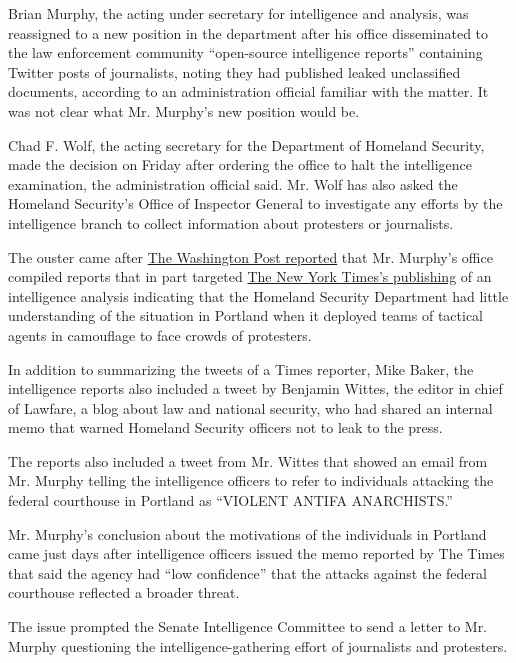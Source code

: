 Brian Murphy, the acting under secretary for intelligence and analysis,
was reassigned to a new position in the department after his office
disseminated to the law enforcement community ``open-source intelligence
reports'' containing Twitter posts of journalists, noting they had
published leaked unclassified documents, according to an administration
official familiar with the matter. It was not clear what Mr. Murphy's
new position would be.

Chad F. Wolf, the acting secretary for the Department of Homeland
Security, made the decision on Friday after ordering the office to halt
the intelligence examination, the administration official said. Mr. Wolf
has also asked the Homeland Security's Office of Inspector General to
investigate any efforts by the intelligence branch to collect
information about protesters or journalists.

The ouster came after
\href{https://www.washingtonpost.com/national-security/dhs-compiled-intelligence-reports-on-journalists-who-published-leaked-documents/2020/07/30/5be5ec9e-d25b-11ea-9038-af089b63ac21_story.html}{The
Washington Post reported} that Mr. Murphy's office compiled reports that
in part targeted
\href{https://www.nytimes.com/2020/07/28/us/federal-agents-portland-seattle-protests.html}{The
New York Times's publishing} of an intelligence analysis indicating that
the Homeland Security Department had little understanding of the
situation in Portland when it deployed teams of tactical agents in
camouflage to face crowds of protesters.

In addition to summarizing the tweets of a Times reporter, Mike Baker,
the intelligence reports also included a tweet by Benjamin Wittes, the
editor in chief of Lawfare, a blog about law and national security, who
had shared an internal memo that warned Homeland Security officers not
to leak to the press.

The reports also included a tweet from Mr. Wittes that showed an email
from Mr. Murphy telling the intelligence officers to refer to
individuals attacking the federal courthouse in Portland as ``VIOLENT
ANTIFA ANARCHISTS.''

Mr. Murphy's conclusion about the motivations of the individuals in
Portland came just days after intelligence officers issued the memo
reported by The Times that said the agency had ``low confidence'' that
the attacks against the federal courthouse reflected a broader threat.

The issue prompted the Senate Intelligence Committee to send a letter to
Mr. Murphy questioning the intelligence-gathering effort of journalists
and protesters.


